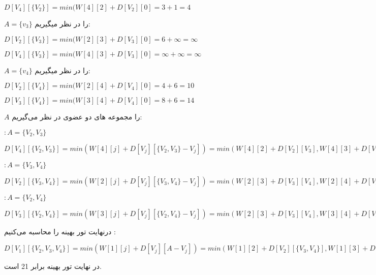 \documentclass{article}
\begin{document}
\begin{enumerate}
\begin{flushleft}
	 	$D[V_4][\{V_2\}] = min(W[4][2] + D[V_2][0] = 3+1 = 4$
	 	
	\end{flushleft}
	 	
	 	 $A = \{v_3\}$ را در نظر میگیریم:
	 	
	\begin{flushleft}
	 		$D[V_2][\{V_3\}] = min(W[2][3] + D[V_3][0] = 6+\infty = \infty$
	 		
	 		$D[V_4][\{V_3\}] = min(W[4][3] + D[V_3][0] = \infty+\infty = \infty$
	 	
	 	
	 \end{flushleft}
 
  	 $A = \{v_4\}$ را در نظر میگیریم:
 
 \begin{flushleft}
 	$D[V_2][\{V_4\}] = min(W[2][4] + D[V_4][0] = 4+6 = 10$
 	
 	$D[V_3][\{V_4\}] = min(W[3][4] + D[V_4][0] = 8+6 = 14$
 	
 	
 \end{flushleft}

$A$ را مجموعه های دو عضوی در نظر می‌گیریم:

$: A = \{V_2 , V_3\} $

\begin{flushleft}
	$D[V_4][\{V_2 , V_3\}] = min(W[4][j] + D[V_j][\{V_2 , V_3\}-V_j]) = min(W[4][2] + D[V_2][V_3] , W[4][3] + D[V_3][V_2]) = min(3 + \infty , \infty + 8) = \infty$
\end{flushleft}

$: A = \{V_3 , V_4\} $

\begin{flushleft}
	$D[V_2][\{V_3 , V_4\}] = min(W[2][j] + D[V_j][\{V_3 , V_4\}-V_j]) = min(W[2][3] + D[V_3][V_4] , W[2][4] + D[V_4][V_3]) = min(6 + 14 , 4 + \infty ) = 20$
	
\end{flushleft}

$: A = \{V_2 , V_4\} $

\begin{flushleft}
	$D[V_3][\{V_2 , V_4\}] = min(W[3][j] + D[V_j][\{V_2 , V_4\}-V_j]) = min(W[2][3] + D[V_3][V_4] , W[3][4] + D[V_4][V_2]) = min(7 + 10 , 8 + 4) = 12$
	
\end{flushleft}

درنهایت تور بهینه را محاسبه می‌کنیم :

\begin{flushleft}
	$D[V_1][\{V_2 , V_3 , V_4 \}] = min(W[1][j] + D[V_j][A-V_j]) = min(W[1][2] + D[V_2][\{V_3 , V_4\}] , W[1][3] + D[V_3][\{V_2 , V_4 \}], W[1][4] + D[V_4][\{V_2 , V_3\}]) = min(2+20+ , 9+12 , \infty + \infty) = 21$
\end{flushleft}

در نهایت تور بهینه برابر 21 است.
	 
	 
\end{enumerate}
\end{document}
